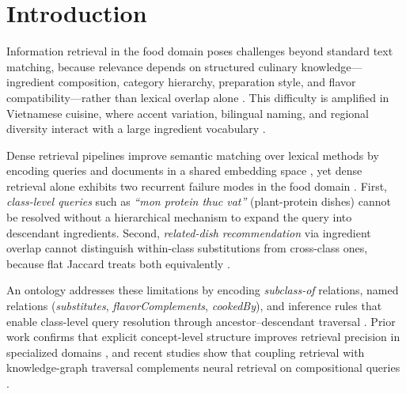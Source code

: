 \section{Introduction}
\label{sec:introduction}

Information retrieval in the food domain poses challenges beyond standard text matching, because relevance depends on structured culinary knowledge---ingredient composition, category hierarchy, preparation style, and flavor compatibility---rather than lexical overlap alone \cite{manning2008introduction, robertson2009probabilistic, karpukhin2020dense, min2022applications}. This difficulty is amplified in Vietnamese cuisine, where accent variation, bilingual naming, and regional diversity interact with a large ingredient vocabulary \cite{nguyen2020phobert}.

Dense retrieval pipelines improve semantic matching over lexical methods by encoding queries and documents in a shared embedding space \cite{karpukhin2020dense, gao2023rag}, yet dense retrieval alone exhibits two recurrent failure modes in the food domain \cite{barnett2024seven, edge2024local}. First, \emph{class-level queries} such as \textit{``mon protein thuc vat''} (plant-protein dishes) cannot be resolved without a hierarchical mechanism to expand the query into descendant ingredients. Second, \emph{related-dish recommendation} via ingredient overlap cannot distinguish within-class substitutions from cross-class ones, because flat Jaccard treats both equivalently \cite{park2021flavorgraph}.

An ontology addresses these limitations by encoding \emph{subclass-of} relations, named relations (\emph{substitutes}, \emph{flavorComplements}, \emph{cookedBy}), and inference rules that enable class-level query resolution through ancestor--descendant traversal \cite{gruber1993translation, dooley2018foodon}. Prior work confirms that explicit concept-level structure improves retrieval precision in specialized domains \cite{vallet2005ontology, fernandez2011semantic, castells2007adaptation}, and recent studies show that coupling retrieval with knowledge-graph traversal complements neural retrieval on compositional queries \cite{sun2023think, he2024g}.

